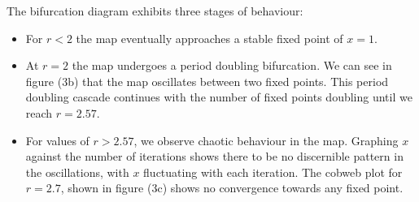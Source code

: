 \documentclass[a4paper]{article}
\begin{document}
The bifurcation diagram exhibits three stages of behaviour:
\begin{itemize}
\item For $ r < 2 $ the map eventually approaches a stable fixed point of $ x=1 $.

\item At $ r = 2 $ the map undergoes a period doubling bifurcation. We can see in figure (3b) that the map oscillates between two fixed points. This period doubling cascade continues with the number of fixed points doubling until we reach $ r = 2.57 $.

\item For values of $ r > 2.57 $, we observe chaotic behaviour in the map. Graphing $ x $ against the number of iterations
shows there to be no discernible pattern in the oscillations, with $ x $ fluctuating with each iteration. The cobweb plot for $ r = 2.7 $, shown in figure (3c) shows no convergence towards any fixed point.
\end{itemize}
\end{document}
